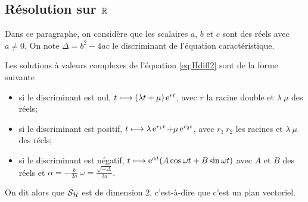 \subsection{Résolution sur \(\mathbb{R}\)}
\label{subsec:resR}
Dans ce paragraphe, on considère que les scalaires \(a\), \(b\) et \(c\) sont des réels avec \(a \neq 0\). On note \(\Delta=b^2-4ac\) le discriminant de l'équation caractéristique.
\begin{theo}
  \label{theo:6} 
  Les solutions à valeurs complexes de l'équation \eqref{eq:Hdiff2} sont de la forme suivante
  \begin{itemize}
  \item si le discriminant est nul, \(t \longmapsto (\lambda t + \mu)\operatorname{e}^{rt}\), avec \(r\) la racine double et \(\lambda \ \mu\) des réels;
  \item si le discriminant est positif, \(t \longmapsto \lambda \operatorname{e}^{r_1 t} + \mu \operatorname{e}^{r_2 t}\), avec \(r_1 \ r_2\) les racines et \(\lambda \ \mu\) des réels;
  \item si le discriminant est négatif, \(t \longmapsto \operatorname{e}^{\alpha t} (A \cos \omega t + B \sin \omega t)\) avec \(A\) et \(B\) des réels et \(\alpha=-\frac{b}{2a} \ \omega = \frac{\sqrt{-\Delta}}{2a}\).
  \end{itemize}
  On dit alors que \(\mathcal{S}_{\mathcal{H}}\) est de dimension 2, c'est-à-dire que c'est un plan vectoriel.
\end{theo}
